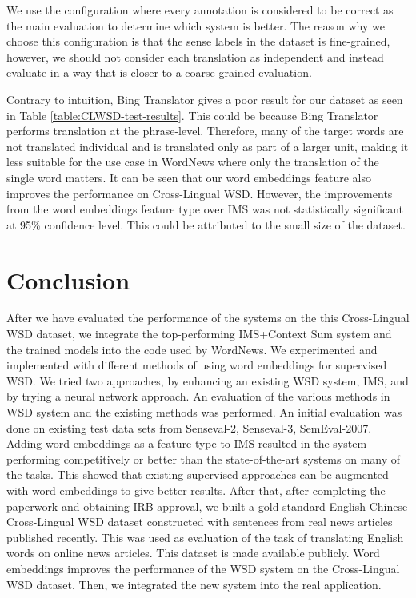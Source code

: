 \documentclass[11pt]{article}
\begin{document}
We use the configuration where every annotation is considered to be correct as the main evaluation to determine which system is better. The reason why we choose this configuration is that the sense labels in the dataset is fine-grained, however, we should not consider each translation as independent and instead evaluate in a way that is closer to a coarse-grained evaluation. 

Contrary to intuition, Bing Translator gives a poor result for our dataset as seen in Table \ref{table:CLWSD-test-results}. This could be because Bing Translator performs translation at the phrase-level. Therefore, many of the target words are not translated individual and is translated only as part of a larger unit, making it less suitable for the use case in WordNews where only the translation of the single word matters. 
It can be seen that our word embeddings feature also improves the performance on Cross-Lingual WSD. However, the improvements from the word embeddings feature type over IMS was not statistically significant at 95\% confidence level. This could be attributed to the small size of the dataset.



\section{Conclusion}
\label{section:conclusion}

After we have evaluated the performance of the systems on the this Cross-Lingual WSD dataset, we integrate the top-performing IMS+Context Sum system and the trained models into the code used by WordNews. We experimented and implemented with different methods of using word embeddings for supervised WSD. We tried two approaches, by enhancing an existing WSD system, IMS, and by trying a neural network approach. An evaluation of the various methods in WSD system and the existing methods was performed. An initial evaluation was done on existing test data sets from Senseval-2, Senseval-3, SemEval-2007. Adding word embeddings as a feature type to IMS resulted in the system performing competitively or better than the state-of-the-art systems on many of the tasks. This showed that existing supervised approaches can be augmented with word embeddings to give better results. After that, after completing the paperwork and obtaining IRB approval, we built a gold-standard English-Chinese Cross-Lingual WSD dataset constructed with sentences from real news articles published recently. This was used as evaluation of the task of translating English words on online news articles. This dataset is made available publicly. Word embeddings improves the performance of the WSD system on the Cross-Lingual WSD dataset. Then, we integrated the new system into the real application. 
\end{document}
